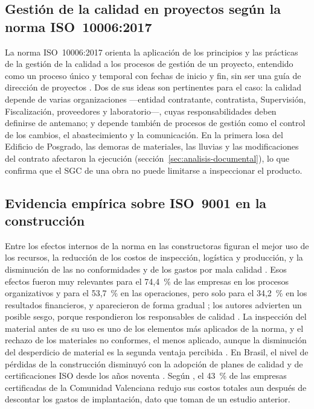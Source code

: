 \subsection{Gestión de la calidad en proyectos según la norma ISO~10006:2017}

La norma ISO~10006:2017 orienta la aplicación de los principios y las prácticas de la gestión de la calidad a los procesos de gestión de un proyecto, entendido como un proceso único y temporal con fechas de inicio y fin, sin ser una guía de dirección de proyectos \parencite{iso10006_2017}. Dos de sus ideas son pertinentes para el caso: la calidad depende de varias organizaciones ---entidad contratante, contratista, Supervisión, Fiscalización, proveedores y laboratorio---, cuyas responsabilidades deben definirse de antemano; y depende también de procesos de gestión como el control de los cambios, el abastecimiento y la comunicación. En la primera losa del Edificio de Posgrado, las demoras de materiales, las lluvias y las modificaciones del contrato afectaron la ejecución (sección~\ref{sec:analisis-documental}), lo que confirma que el SGC de una obra no puede limitarse a inspeccionar el producto.

\subsection{Evidencia empírica sobre ISO~9001 en la construcción}

Entre los efectos internos de la norma en las constructoras figuran el mejor uso de los recursos, la reducción de los costos de inspección, logística y producción, y la disminución de las no conformidades y de los gastos por mala calidad \parencite[p.~156]{pradoroman2018}. Esos efectos fueron muy relevantes para el 74,4~\% de las empresas en los procesos organizativos y para el 53,7~\% en las operaciones, pero solo para el 34,2~\% en los resultados financieros, y aparecieron de forma gradual \parencite[pp.~163--164]{pradoroman2018}; los autores advierten un posible sesgo, porque respondieron los responsables de calidad \parencite[p.~165]{pradoroman2018}. La inspección del material antes de su uso es uno de los elementos más aplicados de la norma, y el rechazo de los materiales no conformes, el menos aplicado, aunque la disminución del desperdicio de material es la segunda ventaja percibida \parencite[pp.~1139--1140]{shaikh2020}. En Brasil, el nivel de pérdidas de la construcción disminuyó con la adopción de planes de calidad y de certificaciones ISO desde los años noventa \parencite[p.~106]{maciel2016}. Según \textcite[p.~43]{dzul2009}, el 43~\% de las empresas certificadas de la Comunidad Valenciana redujo sus costos totales aun después de descontar los gastos de implantación, dato que toman de un estudio anterior.

